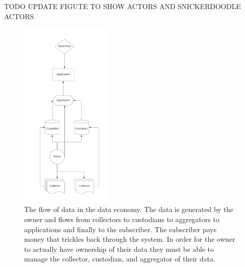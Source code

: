 TODO UPDATE FIGUTE TO SHOW ACTORS AND SNICKERDOODLE ACTORS
\begin{figure}[!htbp] 
    \centering
    \includegraphics[width=170]{images/persona_strucutre.jpg}
    \caption{The flow of data in the data economy. The data is generated by the owner and flows from collectors to custodians to aggregators to applications and finally to the subscriber. The subscriber pays money that trickles back through the system. In order for the owner to actually have ownership of their data they must be able to manage the collector, custodian, and aggregator of their data.}
    \label{fig:DataActors}
\end{figure}




